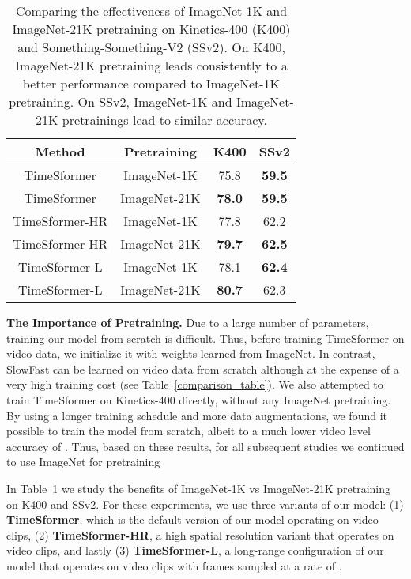 \documentclass{article}
\begin{document}
 
 \begin{table}
\centering
{\scriptsize
 \begin{tabular}{c c c c }
 \hline
{Method} & {Pretraining} & {K400} & {SSv2} \\ 
 \hline
TimeSformer & ImageNet-1K & 75.8  & \bf 59.5 \\
TimeSformer & ImageNet-21K & \bf 78.0  & \bf 59.5 \\ \hline
TimeSformer-HR & ImageNet-1K  & 77.8  &  62.2 \\
TimeSformer-HR & ImageNet-21K  & \bf 79.7  & \bf 62.5 \\ \hline
TimeSformer-L & ImageNet-1K & 78.1 & \bf 62.4\\ 
TimeSformer-L & ImageNet-21K & \bf 80.7 & 62.3\\ 
 \hline
 \end{tabular}
 }
  \vspace{-0.1cm}
\caption{Comparing the effectiveness of ImageNet-1K and ImageNet-21K pretraining on Kinetics-400 (K400) and Something-Something-V2 (SSv2). On K400, ImageNet-21K pretraining leads consistently to a better performance compared to ImageNet-1K pretraining. On SSv2, ImageNet-1K and ImageNet-21K pretrainings lead to similar accuracy.\vspace{-0.3cm}}
\label{pretraining_results_table}
 \end{table}



\textbf{The Importance of Pretraining.} Due to a large number of parameters, training our model from scratch is difficult. Thus, before training TimeSformer on video data, we initialize it with weights learned from ImageNet. In contrast, SlowFast can be learned on video data from scratch although at the expense of a very high training cost  (see Table~\ref{comparison_table}). We also attempted to train TimeSformer on Kinetics-400 directly, without any ImageNet pretraining. By using a longer training schedule and more data augmentations, we found it possible to train the model from scratch, albeit to a much lower video level accuracy of . Thus, based on these results, for all subsequent studies we continued to use ImageNet for pretraining~\cite{5206848}

In Table~\ref{pretraining_results_table} we study the benefits of ImageNet-1K vs ImageNet-21K pretraining on K400 and SSv2. For these experiments, we use three variants of our model: (1) \textbf{TimeSformer}, which is the default version of our model operating on  video clips, (2) \textbf{TimeSformer-HR}, a high spatial resolution variant that operates on  video clips, and lastly (3) \textbf{TimeSformer-L}, a long-range configuration of our model that operates on   video clips with frames sampled at a rate of .
\end{document}

